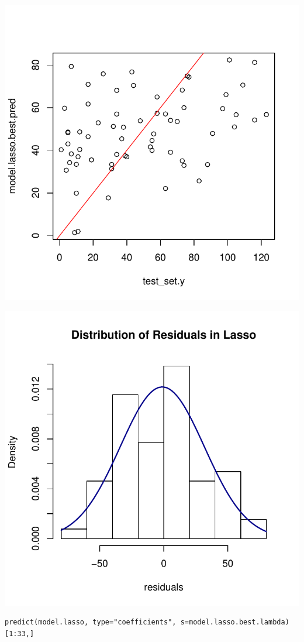 \documentclass[]{report}
\begin{document}
\begin{center}
	\includegraphics[width=0.8\linewidth]{Figures/lasso_predicted.pdf}
\end{center}

\begin{center}
	\includegraphics[width=0.8\linewidth]{Figures/lasso_residuals.pdf}
\end{center}

\begin{lstlisting}
predict(model.lasso, type="coefficients", s=model.lasso.best.lambda)[1:33,]
\end{lstlisting}
\end{document}
